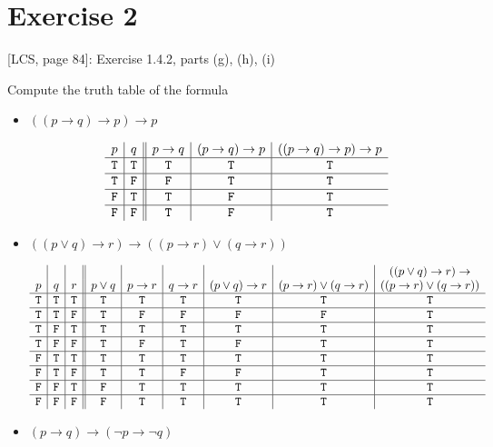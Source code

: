 \documentclass[12pt,leqno]{article}
\newcommand{\T}{\mathtt{T}}
\newcommand{\F}{\mathtt{F}}
\begin{document}
\section*{Exercise 2}

[LCS, page 84]: Exercise 1.4.2, parts (g), (h), (i)

Compute the truth table of the formula

\begin{itemize}

\item[(g)] $((p \to q) \to p) \to p$

\[
\begin{array}{ c | c || c | c | c }
  p & q & p \to q & (p \to q) \to p & ((p \to q) \to p) \to p \\
\hline
  \T & \T & \T & \T & \T \\
\hline
  \T & \F & \F & \T & \T \\
\hline
  \F & \T & \T & \F & \T \\
\hline
  \F & \F & \T & \F & \T \\
\end{array}
\]
\medskip

\item[(h)] $((p \lor q) \to r) \to ((p \to r) \lor (q \to r))$

\[
\begin{array}{ c | c | c || c | c | c | c | c | c }
  & & & & & & & & ((p \lor q) \to r) \to \\
  p & q & r & p \lor q & p \to r & q \to r & (p \lor q) \to r &
    (p \to r) \lor (q \to r) & ((p \to r) \lor (q \to r)) \\
\hline
  \T & \T & \T & \T & \T & \T & \T & \T & \T \\
\hline
  \T & \T & \F & \T & \F & \F & \F & \F & \T \\
\hline
  \T & \F & \T & \T & \T & \T & \T & \T & \T \\
\hline
  \T & \F & \F & \T & \F & \T & \F & \T & \T \\
\hline
  \F & \T & \T & \T & \T & \T & \T & \T & \T \\
\hline
  \F & \T & \F & \T & \T & \F & \F & \T & \T \\
\hline
  \F & \F & \T & \F & \T & \T & \T & \T & \T \\
\hline
  \F & \F & \F & \F & \T & \T & \T & \T & \T \\
\end{array}
\]
\medskip

\newpage
\item[(i)] $(p \to q) \to (\lnot p \to \lnot q)$


\end{itemize}
\end{document}
